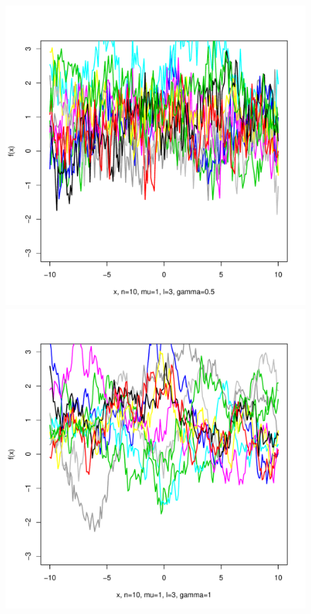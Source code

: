 \documentclass[12pt,letterpaper]{article}
\begin{document}
\begin{figure}
\begin{center}
\includegraphics[scale=0.2]{hw321/n10-m1-l3-g1.pdf}
\includegraphics[scale=0.2]{hw321/n10-m1-l3-g2.pdf}

\end{center}
\end{figure}
\end{document}
